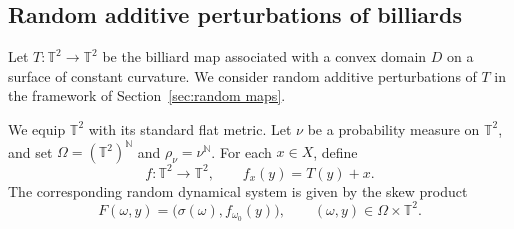 \documentclass[a4paper,12pt,reqno]{amsart}
\numberwithin{equation}{section}
\newtheorem{theorem}{Theorem}[section]
\newtheorem{remark}[theorem]{Remark}
\newcommand{\Nn}{{\mathbb{N}}}
\newcommand{\Tt}{{\mathbb{T}}}
\begin{document}











%


\subsection{Random additive perturbations of billiards}
\label{ss:random_billiards}

Let $T\colon\Tt^2\to\Tt^2$ be the billiard map associated with a convex domain $D$ on a surface of constant curvature. We consider random additive perturbations of $T$ in the framework of Section~\ref{sec:random maps}.

We equip $\Tt^2$ with its standard flat metric. Let $\nu$ be a probability measure on $\Tt^2$, and set $\Omega=(\Tt^2)^{\Nn}$ and $\rho_\nu=\nu^{\Nn}$. For each $x \in X$, define
\[
f\colon \Tt^2\to\Tt^2,
\qquad
f_x(y)=T(y)+x.
\]
The corresponding random dynamical system is given by the skew product
\[
F(\omega,y)=\bigl(\sigma(\omega),f_{\omega_0}(y)\bigr),
\qquad
(\omega,y)\in\Omega\times\Tt^2.
\]
\end{document}
